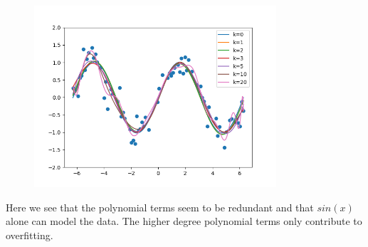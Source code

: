 \begin{answer}
\begin{figure}[H]
    \centering
    \includegraphics[width=9cm]{featuremaps/sine.png}
\end{figure}
Here we see that the polynomial terms seem to be redundant and that $sin(x)$ alone can model the data. The higher degree polynomial terms only contribute to overfitting.
\end{answer}
